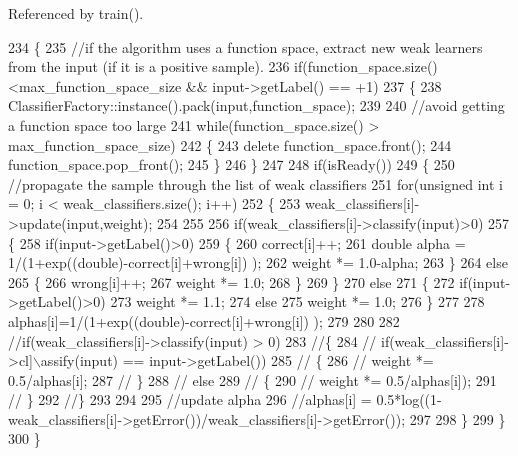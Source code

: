 Referenced by train().


\begin{DoxyCode}
234 \{
235     \textcolor{comment}{//if the algorithm uses a function space, extract new weak learners from the input (if it is a positive
       sample).}
236     \textcolor{keywordflow}{if}(function_space.size()<max\_function\_space\_size && input->getLabel() == +1)
237     \{
238         ClassifierFactory::instance().pack(input,function_space);
239 
240         \textcolor{comment}{//avoid getting a function space too large}
241         \textcolor{keywordflow}{while}(function_space.size() > max\_function\_space\_size)
242         \{
243             \textcolor{keyword}{delete} function_space.front();
244             function_space.pop\_front();
245         \}
246     \}
247 
248     \textcolor{keywordflow}{if}(isReady())
249     \{
250         \textcolor{comment}{//propagate the sample through the list of weak classifiers}
251         \textcolor{keywordflow}{for}(\textcolor{keywordtype}{unsigned} \textcolor{keywordtype}{int} i = 0; i < weak_classifiers.size(); i++)
252         \{
253             weak_classifiers[i]->update(input,weight);
254 
255 
256             \textcolor{keywordflow}{if}(weak_classifiers[i]->classify(input)>0)
257             \{
258                 \textcolor{keywordflow}{if}(input->getLabel()>0)
259                 \{
260                     correct[i]++;
261                     \textcolor{keywordtype}{double} alpha = 1/(1+exp((\textcolor{keywordtype}{double})-correct[i]+wrong[i]) );
262                     weight *= 1.0-alpha;
263                 \}
264                 \textcolor{keywordflow}{else}
265                 \{
266                     wrong[i]++;
267                     weight *= 1.0;
268                 \}
269             \}
270             \textcolor{keywordflow}{else}
271             \{
272                 \textcolor{keywordflow}{if}(input->getLabel()>0)
273                     weight *= 1.1;
274                 \textcolor{keywordflow}{else}
275                     weight *= 1.0;
276             \}
277 
278             alphas[i]=1/(1+exp((\textcolor{keywordtype}{double})-correct[i]+wrong[i]) );
279 
280 
282             \textcolor{comment}{//if(weak\_classifiers[i]->classify(input) > 0)}
283             \textcolor{comment}{//\{}
284             \textcolor{comment}{//    if(weak\_classifiers[i]->cl]\(\backslash\)assify(input) == input->getLabel())}
285             \textcolor{comment}{//    \{}
286             \textcolor{comment}{//        weight *= 0.5/alphas[i];}
287             \textcolor{comment}{//    \}}
288             \textcolor{comment}{//    else}
289             \textcolor{comment}{//    \{}
290             \textcolor{comment}{//        weight *= 0.5/alphas[i]);}
291             \textcolor{comment}{//    \}}
292             \textcolor{comment}{//\}}
293 
294             
295             \textcolor{comment}{//update alpha}
296             \textcolor{comment}{//alphas[i] = 0.5*log((1-weak\_classifiers[i]->getError())/weak\_classifiers[i]->getError());}
297 
298         \}
299     \}
300 \}
\end{DoxyCode}


